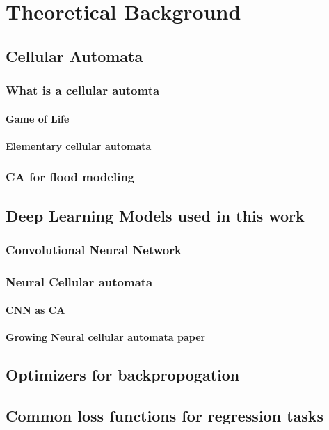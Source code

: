
\chapter{Theoretical Background} %
\label{Chapter2} %

\section{Cellular Automata}
\subsection{What is a cellular automta}
\subsubsection{Game of Life}
\subsubsection{Elementary cellular automata}
\subsection{CA for flood modeling}

\section{Deep Learning Models used in this work}
\subsection{Convolutional Neural Network}
\subsection{Neural Cellular automata}
\subsubsection{CNN as CA}
\subsubsection{Growing Neural cellular automata paper}

\section{Optimizers for backpropogation}
\section{Common loss functions for regression tasks}

